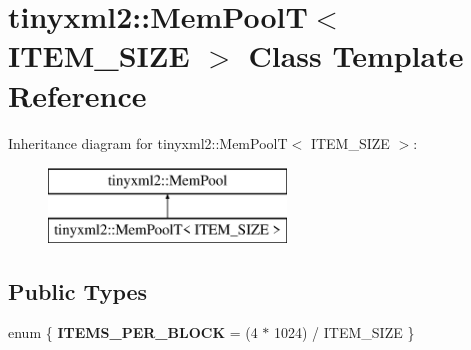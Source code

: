 \hypertarget{classtinyxml2_1_1_mem_pool_t}{}\section{tinyxml2\+:\+:Mem\+Pool\+T$<$ I\+T\+E\+M\+\_\+\+S\+I\+Z\+E $>$ Class Template Reference}
\label{classtinyxml2_1_1_mem_pool_t}
Inheritance diagram for tinyxml2\+:\+:Mem\+Pool\+T$<$ I\+T\+E\+M\+\_\+\+S\+I\+Z\+E $>$\+:\begin{figure}[H]
\begin{center}
\leavevmode
\includegraphics[height=2.000000cm]{classtinyxml2_1_1_mem_pool_t}
\end{center}
\end{figure}
\subsection*{Public Types}
\begin{DoxyCompactItemize}
\item 
\hypertarget{classtinyxml2_1_1_mem_pool_t_a04cf45156e6f913f93972869ff8a1d94}{}enum \{ {\bfseries I\+T\+E\+M\+S\+\_\+\+P\+E\+R\+\_\+\+B\+L\+O\+C\+K} = (4 $\ast$ 1024) / I\+T\+E\+M\+\_\+\+S\+I\+Z\+E
 \}\label{classtinyxml2_1_1_mem_pool_t_a04cf45156e6f913f93972869ff8a1d94}

\end{DoxyCompactItemize}
